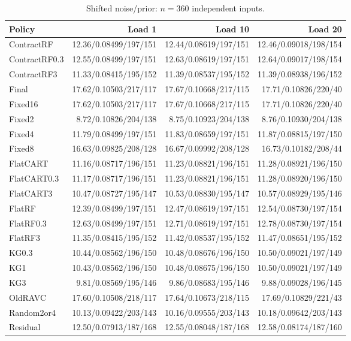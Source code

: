 \begin{table}[!htbp]\centering\scriptsize
\caption{Shifted noise/prior: $n=360$ independent inputs.}\label{supp:confirmshift_confirmation}
\begin{tabular}{@{}lrrr@{}}\toprule
Policy & Load 1 & Load 10 & Load 20\\\midrule
ContractRF & 12.36/0.08499/197/151 & 12.44/0.08619/197/151 & 12.46/0.09018/198/154\\
ContractRF0.3 & 12.55/0.08499/197/151 & 12.63/0.08619/197/151 & 12.64/0.09017/198/154\\
ContractRF3 & 11.33/0.08415/195/152 & 11.39/0.08537/195/152 & 11.39/0.08938/196/152\\
Final & 17.62/0.10503/217/117 & 17.67/0.10668/217/115 & 17.71/0.10826/220/40\\
Fixed16 & 17.62/0.10503/217/117 & 17.67/0.10668/217/115 & 17.71/0.10826/220/40\\
Fixed2 & 8.72/0.10826/204/138 & 8.75/0.10923/204/138 & 8.76/0.10930/204/138\\
Fixed4 & 11.79/0.08499/197/151 & 11.83/0.08659/197/151 & 11.87/0.08815/197/150\\
Fixed8 & 16.63/0.09825/208/128 & 16.67/0.09992/208/128 & 16.73/0.10182/208/44\\
FlatCART & 11.16/0.08717/196/151 & 11.23/0.08821/196/151 & 11.28/0.08921/196/150\\
FlatCART0.3 & 11.17/0.08717/196/151 & 11.23/0.08821/196/151 & 11.28/0.08920/196/150\\
FlatCART3 & 10.47/0.08727/195/147 & 10.53/0.08830/195/147 & 10.57/0.08929/195/146\\
FlatRF & 12.39/0.08499/197/151 & 12.47/0.08619/197/151 & 12.54/0.08730/197/154\\
FlatRF0.3 & 12.63/0.08499/197/151 & 12.71/0.08619/197/151 & 12.78/0.08730/197/154\\
FlatRF3 & 11.35/0.08415/195/152 & 11.42/0.08537/195/152 & 11.47/0.08651/195/152\\
KG0.3 & 10.44/0.08562/196/150 & 10.48/0.08676/196/150 & 10.50/0.09021/197/149\\
KG1 & 10.43/0.08562/196/150 & 10.48/0.08675/196/150 & 10.50/0.09021/197/149\\
KG3 & 9.81/0.08569/195/146 & 9.86/0.08683/195/146 & 9.88/0.09028/196/145\\
OldRAVC & 17.60/0.10508/218/117 & 17.64/0.10673/218/115 & 17.69/0.10829/221/43\\
Random2or4 & 10.13/0.09422/203/143 & 10.16/0.09555/203/143 & 10.18/0.09642/203/143\\
Residual & 12.50/0.07913/187/168 & 12.55/0.08048/187/168 & 12.58/0.08174/187/160\\
\bottomrule\end{tabular}\end{table}

